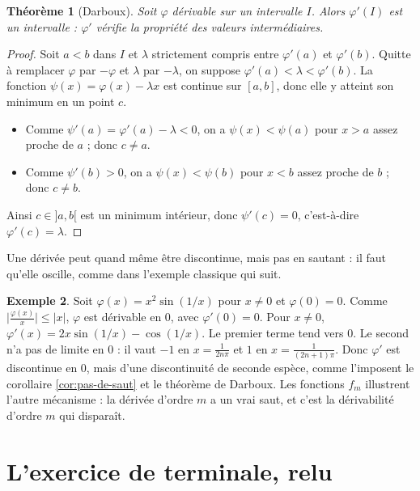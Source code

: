 \documentclass[11pt,a4paper]{article}
\theoremstyle{plain}
\newtheorem{theoreme}{Théorème}[section]
\theoremstyle{definition}
\newtheorem{exemple}[theoreme]{Exemple}
\theoremstyle{remark}
\newcommand{\1}{\mathbf{1}}
\begin{document}
\begin{theoreme}[Darboux]\label{thm:darboux}
Soit $\varphi$ dérivable sur un intervalle $I$. Alors $\varphi'(I)$ est un intervalle : $\varphi'$ vérifie la propriété des valeurs intermédiaires.
\end{theoreme}

\begin{proof}
Soit $a<b$ dans $I$ et $\lambda$ strictement compris entre $\varphi'(a)$ et $\varphi'(b)$. Quitte à remplacer $\varphi$ par $-\varphi$ et $\lambda$ par $-\lambda$, on suppose $\varphi'(a)<\lambda<\varphi'(b)$. La fonction $\psi(x)=\varphi(x)-\lambda x$ est continue sur $[a,b]$, donc elle y atteint son minimum en un point $c$.
\begin{itemize}[nosep]
\item Comme $\psi'(a)=\varphi'(a)-\lambda<0$, on a $\psi(x)<\psi(a)$ pour $x>a$ assez proche de $a$ ; donc $c\neq a$.
\item Comme $\psi'(b)>0$, on a $\psi(x)<\psi(b)$ pour $x<b$ assez proche de $b$ ; donc $c\neq b$.
\end{itemize}
Ainsi $c\in]a,b[$ est un minimum intérieur, donc $\psi'(c)=0$, c'est-à-dire $\varphi'(c)=\lambda$.
\end{proof}

Une dérivée peut quand même être discontinue, mais pas en sautant : il faut qu'elle oscille, comme dans l'exemple classique qui suit.

\begin{exemple}\label{ex:x2sin}
Soit $\varphi(x)=x^2\sin(1/x)$ pour $x\neq0$ et $\varphi(0)=0$. Comme $\big|\frac{\varphi(x)}{x}\big|\leq|x|$, $\varphi$ est dérivable en $0$, avec $\varphi'(0)=0$. Pour $x\neq0$, $\varphi'(x)=2x\sin(1/x)-\cos(1/x)$. Le premier terme tend vers $0$. Le second n'a pas de limite en $0$ : il vaut $-1$ en $x=\frac1{2n\pi}$ et $1$ en $x=\frac1{(2n+1)\pi}$. Donc $\varphi'$ est discontinue en $0$, mais d'une discontinuité de seconde espèce, comme l'imposent le corollaire \ref{cor:pas-de-saut} et le théorème de Darboux. Les fonctions $f_m$ illustrent l'autre mécanisme : la dérivée d'ordre $m$ a un vrai saut, et c'est la dérivabilité d'ordre $m$ qui disparaît.
\end{exemple}

\section{L'exercice de terminale, relu}
\end{document}
